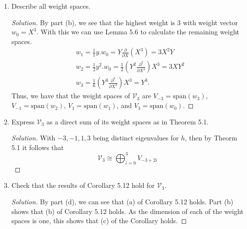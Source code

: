 \documentclass[12pt]{article}
\theoremstyle{definition}
\newenvironment{solution}
{\renewcommand\qedsymbol{$\blacksquare$}\begin{proof}[Solution]}
{\end{proof}}
\begin{document}
\begin{enumerate}
\begin{enumerate}
\begin{solution}
\begin{equation*}
                        \end{equation*}
                        Hence, the weights of $h$ are $-3, -1, 1, 3$.
                    \end{solution}
                \item Describe all weight spaces.
                    \begin{solution}
                        By part (b), we see that the highest weight is $3$ with
                        weight vector $w_0=X^3$. With this we can use Lemma 5.6 to
                        calculate the remaining weight spaces.
                        \begin{equation*}
                            \begin{split}
                                &w_1 =\frac{1}{1}y.w_0=Y\frac{\partial}{\partial
                                X}(X^3)=3X^2Y \\ 
                                &w_2=\frac{1}{2}y^2.w_0=\frac{1}{2}(Y^2\frac{\partial^2}{\partial
                                X^2})X^3=3XY^2 \\
                                &w_3=\frac{1}{6}(Y^3\frac{\partial^3}{\partial
                                X^3})X^3=Y^3.
                            \end{split}
                        \end{equation*}
                        Thus, we have that the weight spaces of $\mathcal{V}_3$
                        are $V_{-3}=\text{span}(w_3)$, $V_{-1}=\text{span}(w_2)$,
                        $V_1=\text{span}(w_1)$, and $V_3=\text{span}(w_0)$.
                    \end{solution}
                \item Express $\mathcal{V}_3$ as a direct sum of its weight
                    spaces as in Theorem 5.1.
                    \begin{solution}
                        With $-3, -1, 1, 3$ being distinct eigenvalues for $h$,
                        then by Theorm 5.1 it follows that 
                        \begin{equation*}
                            \mathcal{V}_3\cong\bigoplus_{i=0}^{3}V_{-3+2i}
                        \end{equation*}
                    \end{solution}
                \item Check that the results of Corollary 5.12 hold for
                    $\mathcal{V}_3$.
                    \begin{solution}
                        By part (d), we can see that (a) of Corollary 5.12
                        holds. Part (b) shows that (b) of Corollary 5.12 holds.
                        As the dimension of each of the weight spaces is one,
                        this shows that (c) of the Corollary holds. 
                    \end{solution}
            \end{enumerate}
    \end{enumerate}
\end{document}
